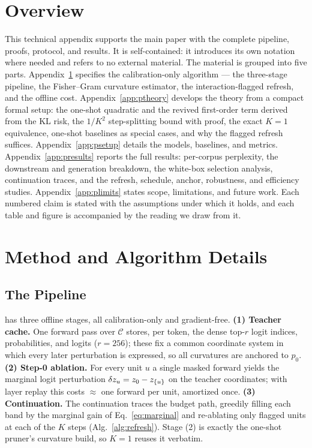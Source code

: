 \section*{Overview}
This technical appendix supports the main paper with the complete pipeline, proofs, protocol, and results.
It is self-contained: it introduces its own notation where needed and refers to no external material.
The material is grouped into five parts.
Appendix~\ref{app:pmethod} specifies the calibration-only algorithm --- the three-stage pipeline, the Fisher--Gram curvature estimator, the interaction-flagged refresh, and the offline cost.
Appendix~\ref{app:ptheory} develops the theory from a compact formal setup: the one-shot quadratic and the revived first-order term derived from the KL risk, the $1/K^2$ step-splitting bound with proof, the exact $K{=}1$ equivalence, one-shot baselines as special cases, and why the flagged refresh suffices.
Appendix~\ref{app:psetup} details the models, baselines, and metrics.
Appendix~\ref{app:presults} reports the full results: per-corpus perplexity, the downstream and generation breakdown, the white-box selection analysis, continuation traces, and the refresh, schedule, anchor, robustness, and efficiency studies.
Appendix~\ref{app:plimits} states scope, limitations, and future work.
Each numbered claim is stated with the assumptions under which it holds, and each table and figure is accompanied by the reading we draw from it.

\section{Method and Algorithm Details}\label{app:pmethod}

\subsection{The \method Pipeline}
\label{app:pipeline}
\method has three offline stages, all calibration-only and gradient-free.
\textbf{(1) Teacher cache.} One forward pass over $\mathcal{C}$ stores, per token, the dense top-$r$
logit indices, probabilities, and logits ($r{=}256$); these fix a common coordinate system in which
every later perturbation is expressed, so all curvatures are anchored to $p_0$.
\textbf{(2) Step-0 ablation.} For every unit $u$ a single masked forward yields the marginal logit
perturbation $\delta z_u=z_0-z_{\{u\}}$ on the teacher coordinates; with layer replay this costs $\approx$
one forward per unit, amortized once. \textbf{(3) Continuation.} The continuation traces the
budget path, greedily filling each band by the marginal gain of Eq.~\eqref{eq:marginal} and
re-ablating only flagged units at each of the $K$ steps (Alg.~\ref{alg:refresh}).
Stage (2) is exactly the one-shot pruner's curvature build, so $K{=}1$ reuses it verbatim.

